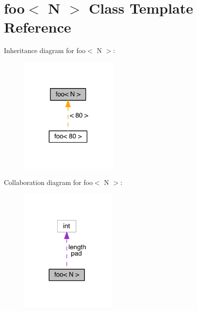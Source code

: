 \hypertarget{structfoo}{}\section{foo$<$ N $>$ Class Template Reference}
\label{structfoo}


Inheritance diagram for foo$<$ N $>$\+:
\nopagebreak
\begin{figure}[H]
\begin{center}
\leavevmode
\includegraphics[width=140pt]{structfoo__inherit__graph}
\end{center}
\end{figure}


Collaboration diagram for foo$<$ N $>$\+:
\nopagebreak
\begin{figure}[H]
\begin{center}
\leavevmode
\includegraphics[width=137pt]{structfoo__coll__graph}
\end{center}
\end{figure}
